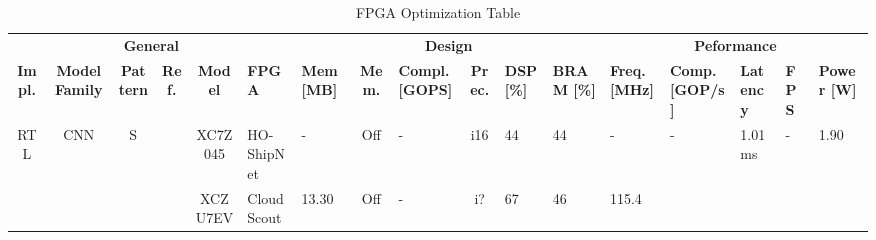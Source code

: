 \begin{table}
\centering

\caption{FPGA Optimization Table}
\label{table:fpga_optim}
\begin{adjustbox}{totalheight=\baselineskip,}

\begin{tabular}{ccccclp{2em}cp{3em}cp{2em}p{4em}p{3em}p{3.5em}p{3.5em}p{2.5em}p{3em}}
 \multicolumn{6}{c}{\textbf{General}} & \multicolumn{6}{c}{\textbf{Design}} & \multicolumn{5}{c}{\textbf{Peformance}}  \\
 \cmidrule(lr){1-6}  \cmidrule(lr){7-12} \cmidrule (lr){13-17}

\textbf{Impl.}&\textbf{Model Family} &\textbf{Pattern} &\textbf{Ref.} &\textbf{Model} &\textbf{FPGA} &\textbf{Mem [MB]} &\textbf{Mem.} &\textbf{Compl. [GOPS]} &\textbf{Prec.} &\textbf{DSP [\%]} &\textbf{BRAM [\%]} &\textbf{Freq. [MHz]} &\textbf{Comp. [GOP/s]} &\textbf{Latency} &\textbf{FPS}&\textbf{Power [W]} \\
 \toprule
 \multirow{27}{*}{RTL}
   &\multirow{19}{*}{CNN}
       &\multirow{6}{*}{S}
           &\multirow{1}{*}{\cite{ieracitanoExplainableEmbeddedNeural2024}}
               &\multirow{1}{*}{XC7Z045}
                   &\multirow{1}{*}{HO-ShipNet}
                       &\multirow{1}{*}{-}
                           &\multirow{1}{*}{Off}
                               &\multirow{1}{*}{-}
                                   &\multirow{1}{*}{i16}
                                       &\multirow{1}{*}{44}
                                           &\multirow{1}{*}{44}
                                               &\multirow{1}{*}{-}
                                                   &\multirow{1}{*}{-}
                                                       &\multirow{1}{*}{1.01 ms}
                                                           &\multirow{1}{*}{-}
                                                               &\multirow{1}{*}{1.90}\\
\cmidrule{4-17}
   &   &   &\multirow{1}{*}{\cite{rapuanoFPGAbasedHardwareAccelerator2021a}}
               &\multirow{1}{*}{XCZU7EV}
                   &\multirow{1}{*}{CloudScout}
                       &\multirow{1}{*}{13.30}
                           &\multirow{1}{*}{Off}
                               &\multirow{1}{*}{-}
                                   &\multirow{1}{*}{i?}
                                       &\multirow{1}{*}{67}
                                           &\multirow{1}{*}{46}
                                               &\multirow{1}{*}{115.4}

\end{tabular}
\end{adjustbox}
\end{table}
